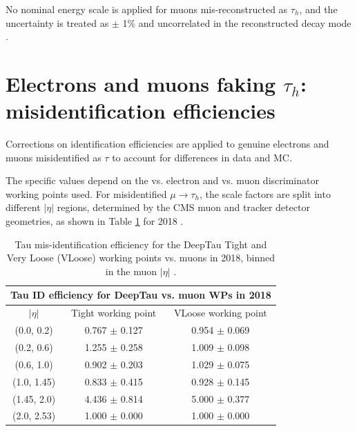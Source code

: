 No nominal energy scale is applied for muons mis-reconstructed as $\tau_{h}$, and the uncertainty is treated as $\pm$ 1\% and uncorrelated in the reconstructed decay mode \cite{twiki_HiggsToTauTauWorkingLegacyRun2}. 

\section{Electrons and muons faking $\tau_{h}$: misidentification efficiencies}
Corrections on identification efficiencies are applied to genuine electrons and muons misidentified as $\tau$ to account for differences in data and MC.

The specific values depend on the vs. electron and vs. muon discriminator working points used. 
For misidentified $\mu \rightarrow \tau_{h}$, the scale factors are split into different $|\eta|$ regions, determined by the CMS muon and tracker detector geometries, as shown in Table \ref{table:tauIDeff_deepTau_vs_muon} for 2018 \cite{twiki_TAU_POG_tauidrecommendationforrun2}.


\begin{table}[h]
    \centering
    \begin{tabular}{|c|c|c|}
    \hline
    \multicolumn{3}{|c|}{Tau ID efficiency for DeepTau vs. muon WPs in 2018} \\ \hline
    \hline
    $|\eta|$  & Tight working point & VLoose working point \\ \hline
    (0.0, 0.2)     & 0.767 $\pm$ 0.127  & 0.954 $\pm$ 0.069  \\ \hline 
    (0.2, 0.6)     & 1.255 $\pm$ 0.258  & 1.009 $\pm$ 0.098  \\ \hline 
    (0.6, 1.0)     & 0.902 $\pm$ 0.203  & 1.029 $\pm$ 0.075 \\ \hline 
    (1.0, 1.45)    & 0.833 $\pm$ 0.415  & 0.928 $\pm$ 0.145\\ \hline
    (1.45, 2.0)    & 4.436 $\pm$ 0.814   & 5.000 $\pm$ 0.377 \\ \hline
    (2.0, 2.53)    & 1.000 $\pm$ 0.000         & 1.000 $\pm$ 0.000\\ \hline
    \end{tabular}
    \caption[Tau mis-identification efficiency for the DeepTau Tight and Very Loose (VLoose) working points vs. muons in 2018.]{Tau mis-identification efficiency for the DeepTau Tight and Very Loose (VLoose) working points vs. muons in 2018, binned in the muon $|\eta|$ \cite{twiki_TAU_POG_tauidrecommendationforrun2}.}
    \label{table:tauIDeff_deepTau_vs_muon}
\end{table}

